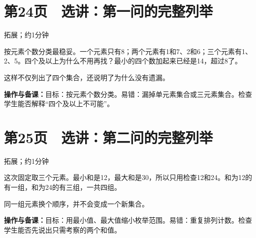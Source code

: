 \documentclass[UTF8,a4paper,11pt,fontset=fandol]{ctexart}
\newcommand{\tip}[1]{\par{\small\color{black!65}\noindent\textbf{操作与备课：}#1\par}}
\begin{document}
\par\noindent\begin{minipage}{\linewidth}

\section*{第24页　选讲：第一问的完整列举}

{\small\noindent 拓展；约1分钟\par}

按元素个数分类最稳妥。一个元素只有8；两个元素有1和7、2和6；三个元素有1、2、5。四个及以上为什么不用再找？最小的四个数加起来已经是14，超过8了。

这样不仅列出了四个集合，还说明了为什么没有遗漏。

\tip{目标：按元素个数分类。易错：漏掉单元素集合或三元素集合。检查学生能否解释“四个及以上不可能”。}

\end{minipage}\par\vspace{2mm}

\par\noindent\begin{minipage}{\linewidth}

\section*{第25页　选讲：第二问的完整列举}

{\small\noindent 拓展；约1分钟\par}

这次固定取三个元素。最小和是12，最大和是30，所以只用检查12和24。和为12的有一组，和为24的有三组，一共四组。

同一组元素换个顺序，并不会变成一个新集合。

\tip{目标：用最小值、最大值缩小枚举范围。易错：重复排列计数。检查学生能否先说出只需考察的两个和值。}

\end{minipage}\par\vspace{2mm}
\end{document}
